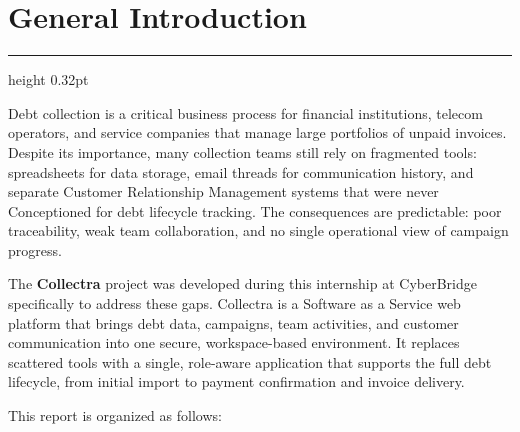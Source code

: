 \documentclass[12pt,a4paper]{report}
\newcommand{\sectionrule}{%
  \vspace{-1pt}%
  {\color{accentblue!22}\hrule height 0.32pt}%
  \vspace{5pt}%
}
\begin{document}
\chapter*{General Introduction}
{}
\sectionrule

Debt collection is a critical business process for financial institutions, telecom
operators, and service companies that manage large portfolios of unpaid invoices.
Despite its importance, many collection teams still rely on fragmented tools:
spreadsheets for data storage, email threads for communication history, and separate
Customer Relationship Management systems that were never Conceptioned for debt lifecycle
tracking.
The consequences are predictable: poor traceability, weak team collaboration, and no
single operational view of campaign progress.

The \textbf{Collectra} project was developed during this internship at CyberBridge
specifically to address these gaps.
Collectra is a Software as a Service web platform that brings debt data, campaigns,
team activities, and customer communication into one secure, workspace-based
environment.
It replaces scattered tools with a single, role-aware application that supports the
full debt lifecycle, from initial import to payment confirmation and invoice delivery.

This report is organized as follows:
\end{document}
